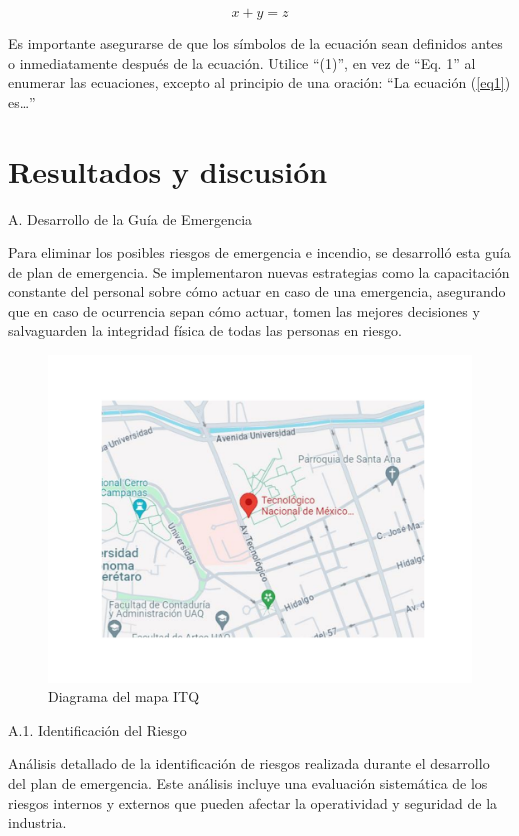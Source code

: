     \begin{equation}
        \label{eq1}
        x + y = z 
    \end{equation}
    
    Es importante asegurarse de que los símbolos de la ecuación sean definidos antes o inmediatamente después de la ecuación. Utilice “(1)”, en vez de “Eq. 1” al enumerar las ecuaciones, excepto al principio de una oración: “La ecuación (\ref{eq1}) es…”
    
    \section{Resultados y discusión}
    A. Desarrollo de la Guía de Emergencia
    
    Para eliminar los posibles riesgos de emergencia e incendio, se desarrolló esta guía de plan de emergencia. Se implementaron nuevas estrategias como la capacitación constante del personal sobre cómo actuar en caso de una emergencia, asegurando que en caso de ocurrencia sepan cómo actuar, tomen las mejores decisiones y salvaguarden la integridad física de todas las personas en riesgo.
    
    \begin{figure}[H]
        \centering
        \includegraphics[scale=0.3]{14/img/mapaItq.pdf}
        \caption{Diagrama del mapa ITQ}
    \end{figure}
    
    A.1. Identificación del Riesgo
    
    Análisis detallado de la identificación de riesgos realizada durante el desarrollo del plan de emergencia. Este análisis incluye una evaluación sistemática de los riesgos internos y externos que pueden afectar la operatividad y seguridad de la industria.
    
